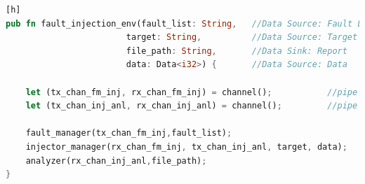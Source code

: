 \begin{lstlisting}[language=rust, style=boxed][h]
pub fn fault_injection_env(fault_list: String,   //Data Source: Fault List
                        target: String,          //Data Source: Target program
                        file_path: String,       //Data Sink: Report
                        data: Data<i32>) {       //Data Source: Data

    let (tx_chan_fm_inj, rx_chan_fm_inj) = channel();           //pipe FLM-FIM
    let (tx_chan_inj_anl, rx_chan_inj_anl) = channel();         //pipe FIM-Analyzer

    fault_manager(tx_chan_fm_inj,fault_list);
    injector_manager(rx_chan_fm_inj, tx_chan_inj_anl, target, data);
    analyzer(rx_chan_inj_anl,file_path);
}
\end{lstlisting}

